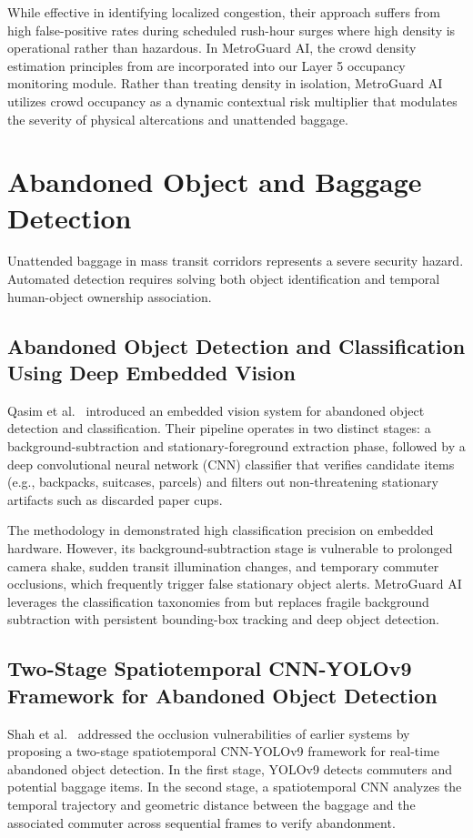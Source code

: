 \documentclass[12pt,a4paper]{report}
\begin{document}
While effective in identifying localized congestion, their approach suffers from high false-positive rates during scheduled rush-hour surges where high density is operational rather than hazardous. In MetroGuard AI, the crowd density estimation principles from \cite{p2} are incorporated into our Layer 5 occupancy monitoring module. Rather than treating density in isolation, MetroGuard AI utilizes crowd occupancy as a dynamic contextual risk multiplier that modulates the severity of physical altercations and unattended baggage.

\section{Abandoned Object and Baggage Detection}
Unattended baggage in mass transit corridors represents a severe security hazard. Automated detection requires solving both object identification and temporal human-object ownership association.

\subsection{Abandoned Object Detection and Classification Using Deep Embedded Vision}
Qasim et al.\ \cite{p3} introduced an embedded vision system for abandoned object detection and classification. Their pipeline operates in two distinct stages: a background-subtraction and stationary-foreground extraction phase, followed by a deep convolutional neural network (CNN) classifier that verifies candidate items (e.g., backpacks, suitcases, parcels) and filters out non-threatening stationary artifacts such as discarded paper cups.

The methodology in \cite{p3} demonstrated high classification precision on embedded hardware. However, its background-subtraction stage is vulnerable to prolonged camera shake, sudden transit illumination changes, and temporary commuter occlusions, which frequently trigger false stationary object alerts. MetroGuard AI leverages the classification taxonomies from \cite{p3} but replaces fragile background subtraction with persistent bounding-box tracking and deep object detection.

\subsection{Two-Stage Spatiotemporal CNN-YOLOv9 Framework for Abandoned Object Detection}
Shah et al.\ \cite{p6} addressed the occlusion vulnerabilities of earlier systems by proposing a two-stage spatiotemporal CNN-YOLOv9 framework for real-time abandoned object detection. In the first stage, YOLOv9 detects commuters and potential baggage items. In the second stage, a spatiotemporal CNN analyzes the temporal trajectory and geometric distance between the baggage and the associated commuter across sequential frames to verify abandonment.
\end{document}
